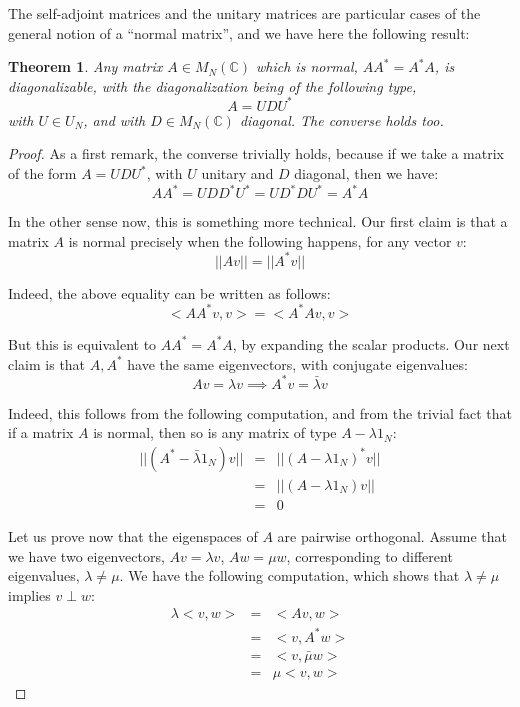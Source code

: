 \documentclass[12pt]{amsbook}
\newtheorem{theorem}{Theorem}[chapter]
\begin{document}
The self-adjoint matrices and the unitary matrices are particular cases of the general notion of a ``normal matrix'', and we have here the following result:


\begin{theorem}
Any matrix $A\in M_N(\mathbb C)$ which is normal, $AA^*=A^*A$, is diagonalizable, with the diagonalization being of the following type,
$$A=UDU^*$$
with $U\in U_N$, and with $D\in M_N(\mathbb C)$ diagonal. The converse holds too.
\end{theorem}

\begin{proof}
As a first remark, the converse trivially holds, because if we take a matrix of the form $A=UDU^*$, with $U$ unitary and $D$ diagonal, then we have:
$$AA^*
=UDD^*U^*
=UD^*DU^*
=A^*A$$

In the other sense now, this is something more technical. Our first claim is that a matrix $A$ is normal precisely when the following happens, for any vector $v$:
$$||Av||=||A^*v||$$

Indeed, the above equality can be written as follows:
$$<AA^*v,v>=<A^*Av,v>$$

But this is equivalent to $AA^*=A^*A$, by expanding the scalar products. Our next claim is that $A,A^*$ have the same eigenvectors, with conjugate eigenvalues:
$$Av=\lambda v\implies A^*v=\bar{\lambda}v$$

Indeed, this follows from the following computation, and from the trivial fact that if a matrix $A$ is normal, then so is any matrix of type $A-\lambda 1_N$:
\begin{eqnarray*}
||(A^*-\bar{\lambda}1_N)v||
&=&||(A-\lambda 1_N)^*v||\\
&=&||(A-\lambda 1_N)v||\\
&=&0
\end{eqnarray*}

Let us prove now that the eigenspaces of $A$ are pairwise orthogonal. Assume that we have two eigenvectors, $Av=\lambda v$, $Aw=\mu w$, corresponding to different eigenvalues, $\lambda\neq\mu$. We have the following computation, which shows that $\lambda\neq\mu$ implies $v\perp w$:
\begin{eqnarray*}
\lambda<v,w>
&=&<Av,w>\\
&=&<v,A^*w>\\
&=&<v,\bar{\mu}w>\\
&=&\mu<v,w>
\end{eqnarray*}


\end{proof}
\end{document}
